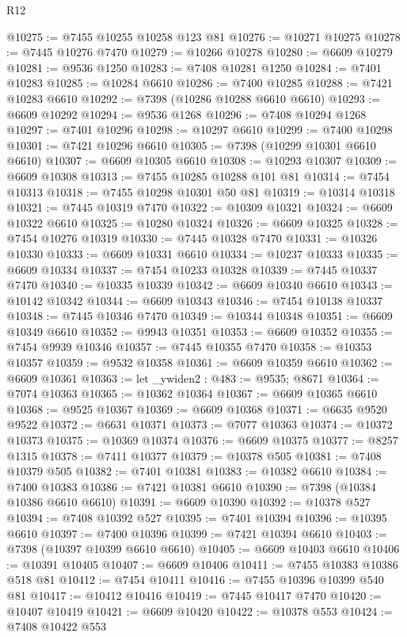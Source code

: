 \begin{lexlean}{R12}
\begin{coremodule}
{{{{{{{{{{{{{{{{{{{{{{{{{{{{{{{{{{{{{{{{{{{{{{{{{{{{{{{{{{{{{{{{{{{{{{{{{{{{{{{{{{@10275 := @7455 @10255 @10258 @123 @81
@10276 := @10271 @10275
@10278 := @7445 @10276 @7470
@10279 := @10266 @10278
@10280 := @6609 @10279
@10281 := @9536 @1250
@10283 := @7408 @10281 @1250
@10284 := @7401 @10283
@10285 := @10284 @6610
@10286 := @7400 @10285
@10288 := @7421 @10283 @6610
@10292 := @7398 (@10286 @10288 @6610 @6610)
@10293 := @6609 @10292
@10294 := @9536 @1268
@10296 := @7408 @10294 @1268
@10297 := @7401 @10296
@10298 := @10297 @6610
@10299 := @7400 @10298
@10301 := @7421 @10296 @6610
@10305 := @7398 (@10299 @10301 @6610 @6610)
@10307 := @6609 @10305 @6610
@10308 := @10293 @10307
@10309 := @6609 @10308
@10313 := @7455 @10285 @10288 @101 @81
@10314 := @7454 @10313
@10318 := @7455 @10298 @10301 @50 @81
@10319 := @10314 @10318
@10321 := @7445 @10319 @7470
@10322 := @10309 @10321
@10324 := @6609 @10322 @6610
@10325 := @10280 @10324
@10326 := @6609 @10325
@10328 := @7454 @10276 @10319
@10330 := @7445 @10328 @7470
@10331 := @10326 @10330
@10333 := @6609 @10331 @6610
@10334 := @10237 @10333
@10335 := @6609 @10334
@10337 := @7454 @10233 @10328
@10339 := @7445 @10337 @7470
@10340 := @10335 @10339
@10342 := @6609 @10340 @6610
@10343 := @10142 @10342
@10344 := @6609 @10343
@10346 := @7454 @10138 @10337
@10348 := @7445 @10346 @7470
@10349 := @10344 @10348
@10351 := @6609 @10349 @6610
@10352 := @9943 @10351
@10353 := @6609 @10352
@10355 := @7454 @9939 @10346
@10357 := @7445 @10355 @7470
@10358 := @10353 @10357
@10359 := @9532 @10358
@10361 := @6609 @10359 @6610
@10362 := @6609 @10361
@10363 := let _ywiden2 : @483 := @9535; @8671
@10364 := @7074 @10363
@10365 := @10362 @10364
@10367 := @6609 @10365 @6610
@10368 := @9525 @10367
@10369 := @6609 @10368
@10371 := @6635 @9520 @9522
@10372 := @6631 @10371
@10373 := @7077 @10363
@10374 := @10372 @10373
@10375 := @10369 @10374
@10376 := @6609 @10375
@10377 := @8257 @1315
@10378 := @7411 @10377
@10379 := @10378 @505
@10381 := @7408 @10379 @505
@10382 := @7401 @10381
@10383 := @10382 @6610
@10384 := @7400 @10383
@10386 := @7421 @10381 @6610
@10390 := @7398 (@10384 @10386 @6610 @6610)
@10391 := @6609 @10390
@10392 := @10378 @527
@10394 := @7408 @10392 @527
@10395 := @7401 @10394
@10396 := @10395 @6610
@10397 := @7400 @10396
@10399 := @7421 @10394 @6610
@10403 := @7398 (@10397 @10399 @6610 @6610)
@10405 := @6609 @10403 @6610
@10406 := @10391 @10405
@10407 := @6609 @10406
@10411 := @7455 @10383 @10386 @518 @81
@10412 := @7454 @10411
@10416 := @7455 @10396 @10399 @540 @81
@10417 := @10412 @10416
@10419 := @7445 @10417 @7470
@10420 := @10407 @10419
@10421 := @6609 @10420
@10422 := @10378 @553
@10424 := @7408 @10422 @553
}}}}}}}}}}}}}}}}}}}}}}}}}}}}}}}}}}}}}}}}}}}}}}}}}}}}}}}}}}}}}}}}}}}}}}}}}}}}}}}}}}
\end{coremodule}
\end{lexlean}
